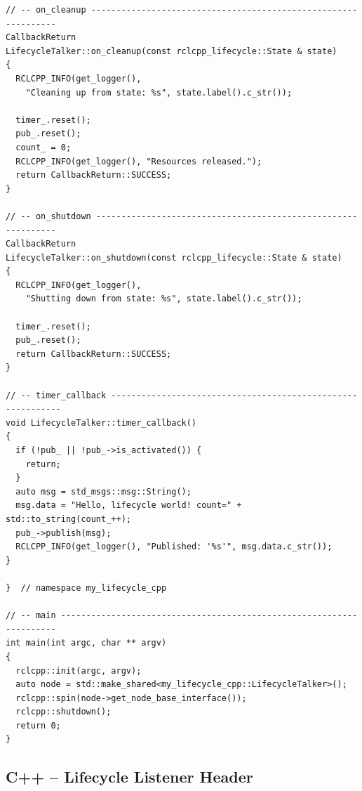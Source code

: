 \documentclass[12pt,a4paper]{article}
\begin{document}
\begin{lstlisting}[style=cpp,caption={src/lifecycle\_talker.cpp}]
// -- on_cleanup ---------------------------------------------------------------
CallbackReturn
LifecycleTalker::on_cleanup(const rclcpp_lifecycle::State & state)
{
  RCLCPP_INFO(get_logger(),
    "Cleaning up from state: %s", state.label().c_str());

  timer_.reset();
  pub_.reset();
  count_ = 0;
  RCLCPP_INFO(get_logger(), "Resources released.");
  return CallbackReturn::SUCCESS;
}

// -- on_shutdown --------------------------------------------------------------
CallbackReturn
LifecycleTalker::on_shutdown(const rclcpp_lifecycle::State & state)
{
  RCLCPP_INFO(get_logger(),
    "Shutting down from state: %s", state.label().c_str());

  timer_.reset();
  pub_.reset();
  return CallbackReturn::SUCCESS;
}

// -- timer_callback ------------------------------------------------------------
void LifecycleTalker::timer_callback()
{
  if (!pub_ || !pub_->is_activated()) {
    return;
  }
  auto msg = std_msgs::msg::String();
  msg.data = "Hello, lifecycle world! count=" + std::to_string(count_++);
  pub_->publish(msg);
  RCLCPP_INFO(get_logger(), "Published: '%s'", msg.data.c_str());
}

}  // namespace my_lifecycle_cpp

// -- main ---------------------------------------------------------------------
int main(int argc, char ** argv)
{
  rclcpp::init(argc, argv);
  auto node = std::make_shared<my_lifecycle_cpp::LifecycleTalker>();
  rclcpp::spin(node->get_node_base_interface());
  rclcpp::shutdown();
  return 0;
}
\end{lstlisting}

\subsection{C++ -- Lifecycle Listener Header}
\end{document}
